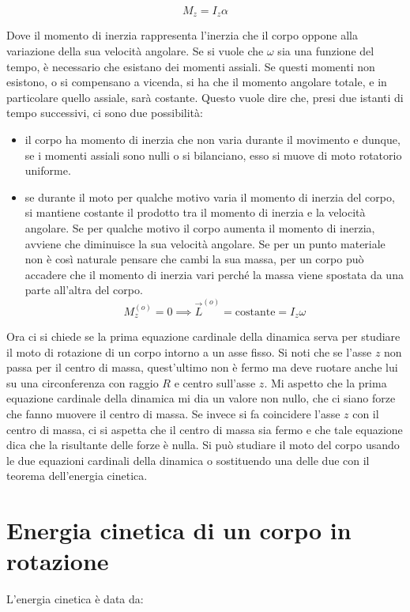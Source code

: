 \[
	M_z = I_z \alpha
\]

Dove il momento di inerzia rappresenta l'inerzia che il corpo oppone alla variazione della sua velocità angolare. Se si vuole che $\omega$ sia una funzione del tempo, è necessario che esistano dei momenti assiali. Se questi momenti non esistono, o si compensano a vicenda, si ha che il momento angolare totale, e in particolare quello assiale, sarà costante. Questo vuole dire che, presi due istanti di tempo successivi, ci sono due possibilità:

\begin{itemize}
	\item il corpo ha momento di inerzia che non varia durante il movimento e dunque, se i momenti assiali sono nulli o si bilanciano, esso si muove di moto rotatorio uniforme.
	\item se durante il moto per qualche motivo varia il momento di inerzia del corpo, si mantiene costante il prodotto tra il momento di inerzia e la velocità angolare. Se per qualche motivo il corpo aumenta il momento di inerzia, avviene che diminuisce la sua velocità angolare. Se per un punto materiale non è così naturale pensare che cambi la sua massa, per un corpo può accadere che il momento di inerzia vari perché la massa viene spostata da una parte all'altra del corpo.
	\[
		M_z^{(o)} = 0 \implies \vec{L}^{(o)} = \text{costante} = I_z\omega
	\]
\end{itemize}

Ora ci si chiede se la prima equazione cardinale della dinamica serva per studiare il moto di rotazione di un corpo intorno a un asse fisso. Si noti che se l'asse $z$ non passa per il centro di massa, quest'ultimo non è fermo ma deve ruotare anche lui su una circonferenza con raggio $R$ e centro sull'asse $z$. Mi aspetto che la prima equazione cardinale della dinamica mi dia un valore non nullo, che ci siano forze che fanno muovere il centro di massa. Se invece si fa coincidere l'asse $z$ con il centro di massa, ci si aspetta che il centro di massa sia fermo e che tale equazione dica che la risultante delle forze è nulla. Si può studiare il moto del corpo usando le due equazioni cardinali della dinamica o sostituendo una delle due con il teorema dell'energia cinetica.

\section{Energia cinetica di un corpo in rotazione}

L'energia cinetica è data da:

